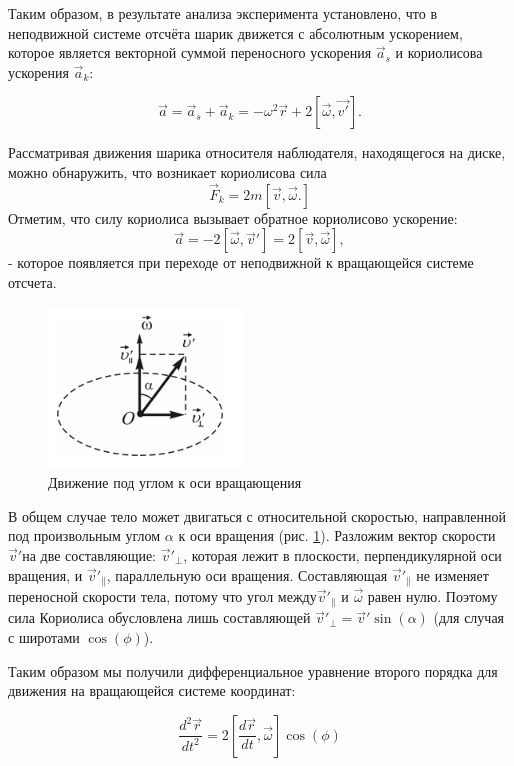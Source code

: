 Таким образом, в результате анализа эксперимента установлено, что в неподвижной системе отсчёта шарик движется с абсолютным ускорением, которое является векторной суммой переносного ускорения \(\vec{a}_s\) и кориолисова ускорения \(\vec{a}_k\):

\[
\vec{a} = \vec{a}_s + \vec{a}_k = -\omega^2 \vec{r} + 2 [\vec{\omega}, \vec{v'}].
\]

Рассматривая движения шарика относителя наблюдателя, находящегося на диске, можно обнаружить, что возникает кориолисова сила 
\begin{equation}
	\vec{F}_k = 2m[\vec{v}, \vec{\omega}.]
\end{equation}
Отметим, что силу кориолиса вызывает обратное кориолисово ускорение:
\[
	\vec{a} = -2[\vec{\omega}, \vec{v}'] = 2[\vec{v}, \vec{\omega}],
\]
- которое появляется при переходе от неподвижной к
вращающейся системе отсчета.

\begin{figure}[h]  %
	\centering
	\includegraphics[height=0.3\textwidth]{imgs/earth.png}  %
	\caption{Движение под углом к оси вращающения}  %
	\label{fig:earth}  %
\end{figure}

В общем случае тело может двигаться с относительной скоростью,
направленной под произвольным углом $\alpha$ к оси вращения (рис. \ref{fig:earth}). Разложим
вектор скорости  $\vec{v}' $на две составляющие: $\vec{v}'_\perp$, которая лежит в плоскости,
перпендикулярной оси вращения, и $\vec{v}'_{\parallel}$, параллельную оси вращения.
Составляющая $\vec{v}'_{\parallel}$ не изменяет переносной скорости тела, потому что угол между$\vec{v}'_{\parallel}$ и $\vec{\omega}$ равен нулю. Поэтому сила Кориолиса обусловлена лишь составляющей $\vec{v}'_\perp = \vec{v}'\sin(\alpha)$ (для случая с широтами $\cos(\phi)$).

Таким образом мы получили дифференциальное уравнение второго порядка для движения на вращающейся системе координат:

\begin{equation}
	\frac{d^2\vec{r}}{dt^2} = 2\left[\frac{d\vec{r}}{dt}, \vec{\omega}\right]\cos(\phi)
	\label{eq:difr}
\end{equation}

